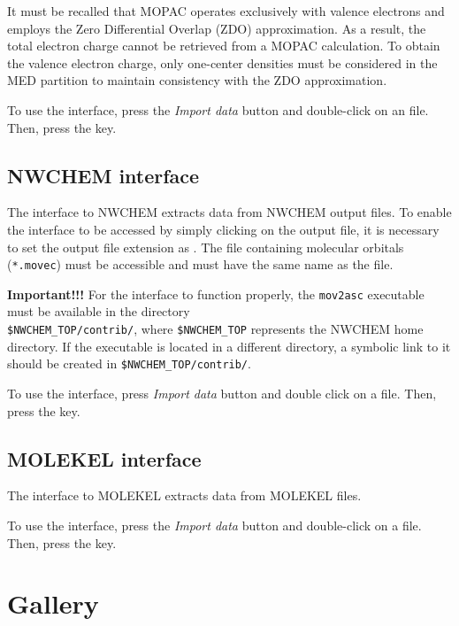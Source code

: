 \documentclass[10pt]{article}
\begin{document}
It must be recalled that MOPAC operates exclusively with valence electrons and employs the 
Zero Differential Overlap (ZDO) approximation.
As a result, the total electron charge cannot be retrieved from a MOPAC calculation.
To obtain the valence electron charge, only one-center densities must be considered 
in the MED partition to maintain consistency with the ZDO approximation.

To use the interface, press the {\it Import data} button \teclapuntos and double-click
on an \aux{ } file. Then, press the \exec key.


\subsection{NWCHEM interface \label{sec:5.6}}

The interface to NWCHEM extracts data from NWCHEM output files. 
To enable the interface to be accessed by simply clicking on the output file, it is necessary to 
set the output file extension as \nwcout{ }. The file containing molecular orbitals (\texttt{*.movec})
must be accessible and must have the same name as the \nwcout{ } file.

{\bf Important!!!} For the interface to function properly, the \texttt{mov2asc} executable must be available in
the directory \\ \texttt{\$NWCHEM\_TOP/contrib/}, where \texttt{\$NWCHEM\_TOP} represents
the NWCHEM home directory. If the executable is located in a different directory,
a symbolic link to it should be created in \texttt{\$NWCHEM\_TOP/contrib/}.


To use the interface, press {\it Import data} button \teclapuntos and double click
on a \nwcout{ } file. Then, press the \exec key.

\subsection{MOLEKEL interface \label{sec:5.7}}

The interface to MOLEKEL extracts data from MOLEKEL \mkl{ } files.

To use the interface, press the {\it Import data} button \teclapuntos and double-click
on a \mkl{ } file. Then, press the \exec key.




\newpage

\section{Gallery \label{sec:6}}
\end{document}

